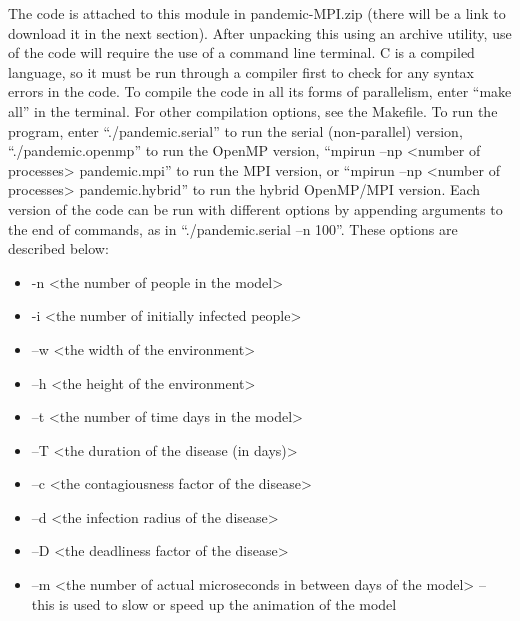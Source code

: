 \documentclass[letterpaper,10pt,openany,oneside]{sphinxmanual}
\begin{document}
The code is attached to this module in pandemic-MPI.zip (there will be a link to download
it in the next section). After unpacking
this using an archive utility, use of the code will require the use of a
command line terminal. C is a compiled language, so it must be run
through a compiler first to check for any syntax errors in the code. To
compile the code in all its forms of parallelism, enter “make all” in
the terminal. For other compilation options, see the Makefile. To run
the program, enter “./pandemic.serial” to run the serial (non-parallel)
version, “./pandemic.openmp” to run the OpenMP version, “mpirun –np
\textless{}number of processes\textgreater{} pandemic.mpi” to run the MPI
version, or “mpirun –np \textless{}number of processes\textgreater{}
pandemic.hybrid” to run the hybrid OpenMP/MPI version. Each version of
the code can be run with different options by appending arguments to the
end of commands, as in “./pandemic.serial –n 100”. These options are
described below:
\begin{itemize}
\item {} 
-n \textless{}the number of people in the model\textgreater{}

\item {} 
-i \textless{}the number of initially infected people\textgreater{}

\item {} 
–w \textless{}the width of the environment\textgreater{}

\item {} 
–h \textless{}the height of the environment\textgreater{}

\item {} 
–t \textless{}the number of time days in the model\textgreater{}

\item {} 
–T \textless{}the duration of the disease (in days)\textgreater{}

\item {} 
–c \textless{}the contagiousness factor of the disease\textgreater{}

\item {} 
–d \textless{}the infection radius of the disease\textgreater{}

\item {} 
–D \textless{}the deadliness factor of the disease\textgreater{}

\item {} 
–m \textless{}the number of actual microseconds in between days of the model\textgreater{} – this is used to slow or speed up the animation of the model

\end{itemize}
\end{document}
